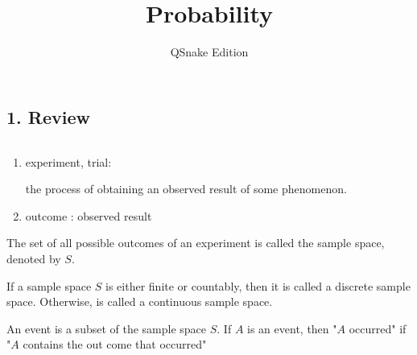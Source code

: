 


\title{Probability}

\author{QSnake Edition}

\maketitle



\subsection*{1. Review}$ $

\begin{enumerate}[wide, label = $\bullet$]
	\item experiment, trial: 
	 
	the process of obtaining an observed result of some phenomenon.
	\item outcome : observed result
\end{enumerate}

\begin{defn}
	The set of all possible outcomes of an experiment is called the sample space, denoted by $S$.
\end{defn}

\begin{defn}
	If a sample space $S$ is either finite or countably, then it is called a discrete sample space. Otherwise, is called a continuous sample space.
\end{defn}

\begin{defn}
	An event is a subset of the sample space $S$. If $A$ is an event, then "$A$ occurred" if "$A$ contains the out come that occurred"
\end{defn}

%

